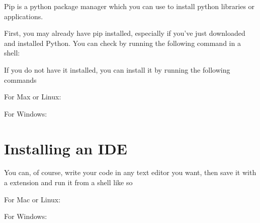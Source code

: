 \documentclass[letterpaper,10pt,english]{sphinxmanual}
\begin{document}
\sphinxAtStartPar
Pip is a python package manager which you can use to install python libraries or applications.

\sphinxAtStartPar
First, you may already have pip installed, especially if you’ve just downloaded and installed Python. You can check by running the following command in a shell:

\begin{sphinxVerbatim}[commandchars=\\\{\}]
 
\end{sphinxVerbatim}

\sphinxAtStartPar
If you do not have it installed, you can install it by running the following commands

\sphinxAtStartPar
For Max or Linux:

\begin{sphinxVerbatim}[commandchars=\\\{\}]
   
\end{sphinxVerbatim}

\sphinxAtStartPar
For Windows:

\begin{sphinxVerbatim}[commandchars=\\\{\}]
   
\end{sphinxVerbatim}


\section{Installing an IDE}
\label{\detokenize{usage:installing-an-ide}}
\sphinxAtStartPar
You can, of course, write your code in any text editor you want, then save it with a  extension and run it from a shell like so

\sphinxAtStartPar
For Mac or Linux:

\begin{sphinxVerbatim}[commandchars=\\\{\}]
 
\end{sphinxVerbatim}

\sphinxAtStartPar
For Windows:

\begin{sphinxVerbatim}[commandchars=\\\{\}]
 
\end{sphinxVerbatim}
\end{document}
